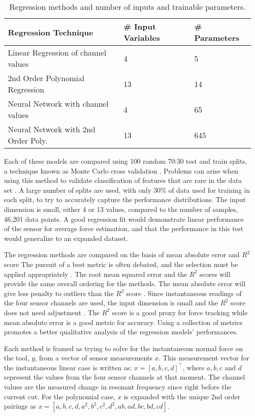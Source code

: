 \begin{table}[b]
\centering
\caption{Regression methods and number of inputs and trainable parameters.}
\label{tab:methods}
\begin{tabular}{|l|l|l|}
\hline
Regression Technique & \# Input Variables &  \# Parameters\\ \hline
Linear Regression of channel values & 4   & 5             \\ \hline
2nd Order Polynomial Regression     & 13  & 14            \\ \hline
Neural Network with channel values  & 4   & 65            \\ \hline
Neural Network with 2nd Order Poly. & 13  & 645           \\ \hline
\end{tabular}
\end{table}

Each of these models are compared using 100 random 70:30 test and train splits, 
a technique known as Monte Carlo cross validation \cite{Girard1989}. 
Problems can arise when using this method to validate classification of features that are rare in the data set
\cite{Catania2022, Janze2017}.
A large number of splits are used, with only 30\% of data used for training in each split,
to try to accurately capture the performance distributions.
The input dimension is small, either 4 or 13 values, 
compared to the number of samples, 46,201 data points.
A good regression fit would demonstrate linear performance of the sensor for average force estimation, 
and that the performance in this test would generalize to an expanded dataset.

The regression methods are compared on the basis of
mean absolute error and $R^2$ score \cite{Lucke1984, Chicco2021, Leach2007}
The pursuit of a best metric is often debated, 
and the selection must be applied appropriately \cite{Tellinghuisen2011}.
The root mean squared error and the $R^2$ scores will provide the same overall ordering for the methods.
The mean absolute error will give less penalty to outliers than the $R^2$ score \cite{rozeboom1978estimation}.
Since instantaneous readings of the four sensor channels are used, 
the input dimension is small and the $R^2$ score does not need adjustment \cite{Leach2007}. 
The $R^2$ score is a good proxy for force tracking while mean absolute error is a good metric for accuracy.
Using a collection of metrics promotes a better qualitative analysis of the regression models' performances.

Each method is framed as trying to solve for 
the instantaneous normal force on the tool, $y$,
from a vector of sensor measurements $x$.
This measurement vector for the instantaneous linear case is written as:
$x = [a, b, c, d]^\top$, where $a,b,c$ and $d$ represent the values from the 
four sensor channels at that moment.
The channel values are the measured change in resonant frequency since 
right before the current cut.
For the polynomial case, $x$ is expanded with the unique 2nd order pairings as
 $x = [a, b, c, d, a^2, b^2, c^2, d^2, ab, ad, bc, bd, cd]$.

